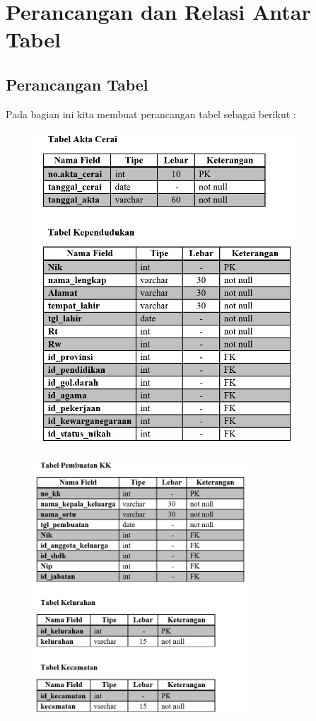 \chapter{Perancangan dan Relasi Antar Tabel}

\section{Perancangan Tabel}
Pada bagian ini kita membuat perancangan tabel sebagai berikut : 
\begin{figure}[H]
	\centering
	\includegraphics[width=10cm]{figures/tabel1.png}
\end{figure}
\begin{figure}[H]
	\centering
	\includegraphics[width=8cm]{figures/tabel2.png}
\end{figure}
